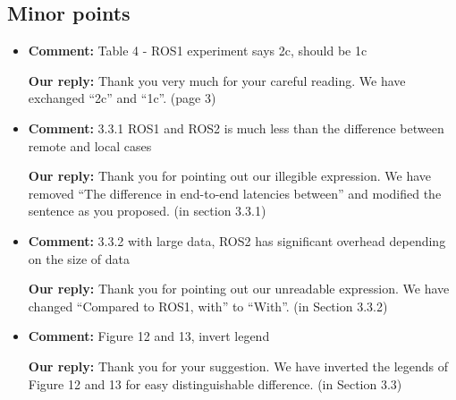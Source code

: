 \documentclass{article}
\begin{document}
\subsection{Minor points}
\begin{itemize}

\item \begin{flushleft}
    \textbf{Comment:} Table 4 - ROS1 experiment says 2c, should be 1c
  \end{flushleft}

  \begin{flushleft}
    \textbf{Our reply:} Thank you very much for your careful reading. We have exchanged ``2c'' and ``1c''. (page 3)
  \end{flushleft}

\item \begin{flushleft}
    \textbf{Comment:} 3.3.1 ROS1 and ROS2 is much less than the difference between remote and local cases
  \end{flushleft}

  \begin{flushleft}
    \textbf{Our reply:} Thank you for pointing out our illegible expression. We have removed ``The difference in end-to-end latencies between'' and modified the sentence as you proposed. (in section 3.3.1)
  \end{flushleft}

\item \begin{flushleft}
    \textbf{Comment:} 3.3.2 with large data, ROS2 has significant overhead depending on the size of data
  \end{flushleft}

  \begin{flushleft}
    \textbf{Our reply:} Thank you for pointing out our unreadable expression. We have changed ``Compared to ROS1, with'' to ``With''. (in Section 3.3.2)
  \end{flushleft}

\item \begin{flushleft}
    \textbf{Comment:} Figure 12 and 13, invert legend
  \end{flushleft}

  \begin{flushleft}
    \textbf{Our reply:} Thank you for your suggestion. We have inverted the legends of Figure 12 and 13 for easy distinguishable difference. (in Section 3.3)
  \end{flushleft}


\end{itemize}
\end{document}
